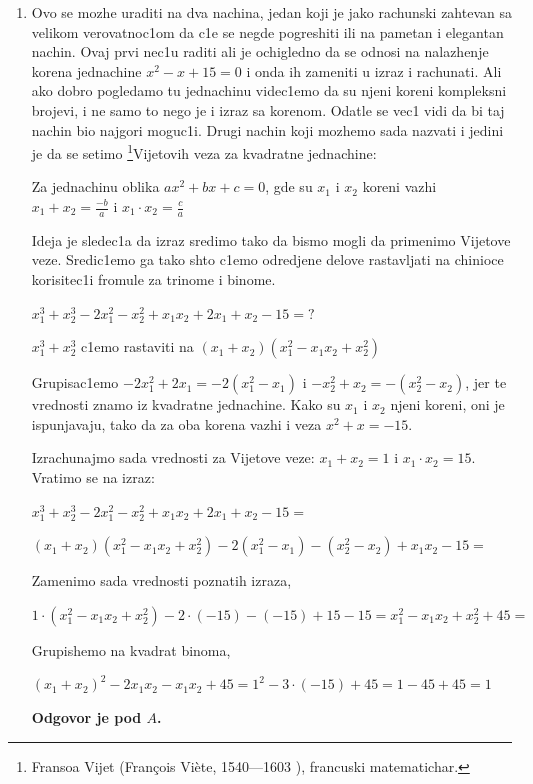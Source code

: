 \documentclass[a4paper,12pt]{article}
\newcommand{\Lat}{\fontencoding{OT1}\selectfont}
\begin{document}
\begin{enumerate}[1.]
\item Ovo se mozhe uraditi na dva nachina, jedan koji je jako rachunski zahtevan sa velikom verovatnoc1om da c1e se negde pogreshiti ili na pametan i elegantan nachin. Ovaj prvi nec1u raditi ali je ochigledno da se odnosi na nalazhenje korena jednachine $x^2 - x + 15 = 0$ i onda ih zameniti u izraz i rachunati. Ali ako dobro pogledamo tu jednachinu videc1emo da su njeni koreni kompleksni brojevi, i ne samo to nego je i izraz sa korenom. Odatle se vec1 vidi da bi taj nachin bio najgori moguc1i. Drugi nachin koji mozhemo sada nazvati i jedini je da se setimo \footnote{ Fransoa Vijet ({\Lat Fran\c{c}ois Vi\`{e}te, 1540---1603 }), francuski matematichar.}{Vijetovih} veza za kvadratne jednachine:
\par Za jednachinu oblika $ax^2 + bx + c = 0$, gde su $x_1$ i $x_2$ koreni vazhi $x_1 + x_2 = \frac{-b}{a}$ i $x_1 \cdot x_2 = \frac{c}{a}$
\par Ideja je sledec1a da izraz sredimo tako da bismo mogli da primenimo Vijetove veze. Sredic1emo ga tako shto c1emo odredjene delove rastavljati na chinioce korisitec1i fromule za trinome i binome.
\par $x_1^3 + x_2^3 - 2x_1^2 - x_2^2 + x_1x_2 + 2x_1 + x_2 -15 = ?$
\par $x_1^3 + x_2^3$ c1emo rastaviti na $(x_1 + x_2)(x_1^2 -x_1x_2 + x_2^2 )$
\par Grupisac1emo $-2x_1^2 +2x_1 = -2(x_1^2 -x_1)$ i $-x_2^2 +x_2 = - (x_2^2 -x_2)$, jer te vrednosti znamo iz kvadratne jednachine. Kako su $x_1$ i $x_2$ njeni koreni, oni je ispunjavaju, tako da za oba korena vazhi i veza $x^2 + x = -15$.
\par Izrachunajmo sada vrednosti za Vijetove veze: $x_1 + x_2 = 1$ i $x_1 \cdot x_2 = 15$. Vratimo se na izraz:
\par $x_1^3 + x_2^3 - 2x_1^2 - x_2^2 + x_1x_2 + 2x_1 + x_2 -15 = $
\par $(x_1 + x_2)(x_1^2 -x_1x_2 + x_2^2 ) -2(x_1^2 -x_1) - (x_2^2 -x_2) +x_1x_2 - 15=  $
\par Zamenimo sada vrednosti poznatih izraza,
\par $ 1 \cdot(x_1^2 -x_1x_2 + x_2^2 ) -2 \cdot(-15) - (-15) +15 - 15 = x_1^2 -x_1x_2 + x_2^2 + 45 = $
\par Grupishemo na kvadrat binoma,
\par $(x_1 + x_2)^2 - 2x_1x_2 - x_1x_2 + 45 = 1^2 -3 \cdot (-15) + 45 = 1 - 45 + 45 = 1$
\par \textbf{Odgovor je pod $A$.}


\end{enumerate}
\end{document}
